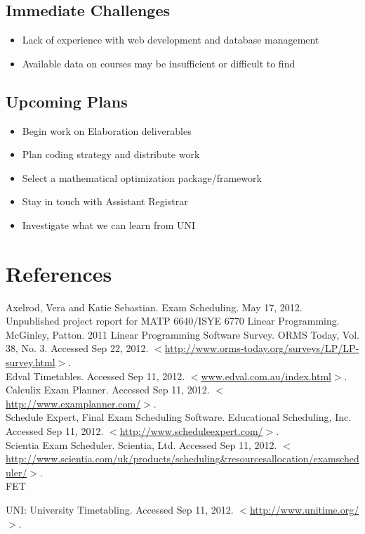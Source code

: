 \documentclass[11pt]{article}
\begin{document}
\subsection{Immediate Challenges} %
\begin{itemize}
\item Lack of experience with web development and database management
\item Available data on courses may be insufficient or difficult to find
\end{itemize}

\subsection{Upcoming Plans}
\begin{itemize}
\item Begin work on Elaboration deliverables
\item Plan coding strategy and distribute work
\item Select a mathematical optimization package/framework
\item Stay in touch with Assistant Registrar
\item Investigate what we can learn from UNI
\end{itemize}

\section*{References}

\hspace{0.25in}Axelrod, Vera and Katie Sebastian. Exam Scheduling. May 17, 2012. Unpublished project report for MATP 6640/ISYE 6770 Linear Programming. \\

McGinley,  Patton. 2011 Linear Programming Software Survey. ORMS Today, Vol. 38, No. 3.  Accessed Sep 22, 2012. $<$\url{http://www.orms-today.org/surveys/LP/LP-survey.html}$>$. \\

Edval Timetables. Accessed Sep 11, 2012. $<$\url{www.edval.com.au/index.html}$>$. \\

Calculix Exam Planner. Accessed Sep 11, 2012. $<$\url{http://www.examplanner.com/}$>$. \\

Schedule Expert, Final Exam Scheduling Software. Educational Scheduling, Inc. Accessed Sep 11, 2012. $<$\url{http://www.scheduleexpert.com/}$>$. \\


Scientia Exam Scheduler. Scientia, Ltd. Accessed Sep 11, 2012.
$<$\url{http://www.scientia.com/uk/products/scheduling&resourcesallocation/examscheduler/}$>$. \\

FET

UNI: University Timetabling. Accessed Sep 11, 2012.  $<$\url{http://www.unitime.org/}$>$.
\end{document}
